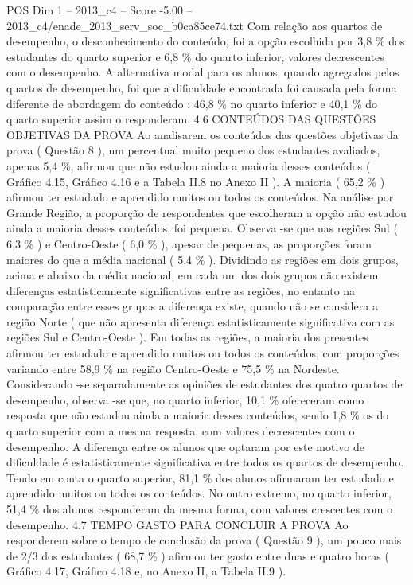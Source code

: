 \begin{textsample}{POS Dim 1 – 2013\_c4 – Score -5.00 – 2013\_c4/enade\_2013\_serv\_soc\_b0ca85ce74.txt}
Com relação aos quartos de desempenho, o desconhecimento do conteúdo, foi a opção escolhida por 3,8 \% dos estudantes do quarto superior e 6,8 \% do quarto inferior, valores decrescentes com o desempenho.
A alternativa modal para os alunos, quando agregados pelos quartos de desempenho, foi que a dificuldade encontrada foi causada pela forma diferente de abordagem do conteúdo : 46,8 \% no quarto inferior e 40,1 \% do quarto superior assim o responderam. 4.6 CONTEÚDOS DAS QUESTÕES OBJETIVAS DA PROVA Ao analisarem os conteúdos das questões objetivas da prova ( Questão 8 ), um percentual muito pequeno dos estudantes avaliados, apenas 5,4 \%, afirmou que não estudou ainda a maioria desses conteúdos ( Gráfico 4.15, Gráfico 4.16 e a Tabela II.8 no Anexo II ).
A maioria ( 65,2 \% ) afirmou ter estudado e aprendido muitos ou todos os conteúdos.
Na análise por Grande Região, a proporção de respondentes que escolheram a opção não estudou ainda a maioria desses conteúdos, foi pequena.
Observa -se que nas regiões Sul ( 6,3 \% ) e Centro-Oeste ( 6,0 \% ), apesar de pequenas, as proporções foram maiores do que a média nacional ( 5,4 \% ).
Dividindo as regiões em dois grupos, acima e abaixo da média nacional, em cada um dos dois grupos não existem diferenças estatisticamente significativas entre as regiões, no entanto na comparação entre esses grupos a diferença existe, quando não se considera a região Norte ( que não apresenta diferença estatisticamente significativa com as regiões Sul e Centro-Oeste ).
Em todas as regiões, a maioria dos presentes afirmou ter estudado e aprendido muitos ou todos os conteúdos, com proporções variando entre 58,9 \% na região Centro-Oeste e 75,5 \% na Nordeste.
Considerando -se separadamente as opiniões de estudantes dos quatro quartos de desempenho, observa -se que, no quarto inferior, 10,1 \% ofereceram como resposta que não estudou ainda a maioria desses conteúdos, sendo 1,8 \% os do quarto superior com a mesma resposta, com valores decrescentes com o desempenho.
A diferença entre os alunos que optaram por este motivo de dificuldade é estatisticamente significativa entre todos os quartos de desempenho.
Tendo em conta o quarto superior, 81,1 \% dos alunos afirmaram ter estudado e aprendido muitos ou todos os conteúdos.
No outro extremo, no quarto inferior, 51,4 \% dos alunos responderam da mesma forma, com valores crescentes com o desempenho. 4.7 TEMPO GASTO PARA CONCLUIR A PROVA Ao responderem sobre o tempo de conclusão da prova ( Questão 9 ), um pouco mais de 2/3 dos estudantes ( 68,7 \% ) afirmou ter gasto entre duas e quatro horas ( Gráfico 4.17, Gráfico 4.18 e, no Anexo II, a Tabela II.9 ).

\end{textsample}

